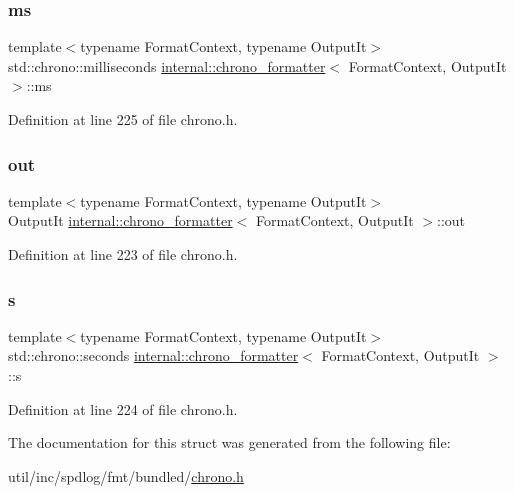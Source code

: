 \subsubsection{\texorpdfstring{ms}{ms}}
{\footnotesize\ttfamily template$<$typename Format\+Context, typename Output\+It$>$ \\
std\+::chrono\+::milliseconds \hyperlink{structinternal_1_1chrono__formatter}{internal\+::chrono\+\_\+formatter}$<$ Format\+Context, Output\+It $>$\+::ms}



Definition at line 225 of file chrono.\+h.

\mbox{\label{structinternal_1_1chrono__formatter_a9e01b4a83c26f7a26fbd3b2a66613b60}} 
\subsubsection{\texorpdfstring{out}{out}}
{\footnotesize\ttfamily template$<$typename Format\+Context, typename Output\+It$>$ \\
Output\+It \hyperlink{structinternal_1_1chrono__formatter}{internal\+::chrono\+\_\+formatter}$<$ Format\+Context, Output\+It $>$\+::out}



Definition at line 223 of file chrono.\+h.

\mbox{\label{structinternal_1_1chrono__formatter_af017aee86082dedb1be9218d369213ee}} 
\subsubsection{\texorpdfstring{s}{s}}
{\footnotesize\ttfamily template$<$typename Format\+Context, typename Output\+It$>$ \\
std\+::chrono\+::seconds \hyperlink{structinternal_1_1chrono__formatter}{internal\+::chrono\+\_\+formatter}$<$ Format\+Context, Output\+It $>$\+::s}



Definition at line 224 of file chrono.\+h.



The documentation for this struct was generated from the following file\+:\begin{DoxyCompactItemize}
\item 
util/inc/spdlog/fmt/bundled/\hyperlink{chrono_8h}{chrono.\+h}\end{DoxyCompactItemize}
